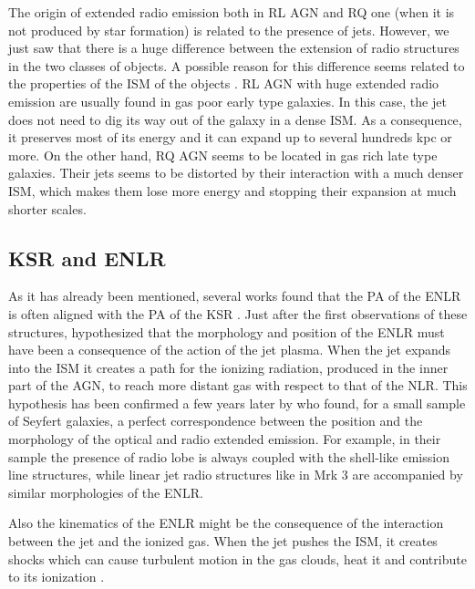 \documentclass[../main.tex]{subfiles}
\begin{document}
The origin of extended radio emission both in RL AGN and RQ one (when it is not produced by star formation) is related to the presence of jets.
However, we just saw that there is a huge difference between the extension of radio structures in the two classes of objects.
A possible reason for this difference seems related to the properties of the ISM of the objects \citep{Whittle04,Gallimore06,Schawinski11,Singh15b}.
RL AGN with huge extended radio emission are usually found in gas poor early type galaxies.
In this case, the jet does not need to dig its way out of the galaxy in a dense ISM.
As a consequence, it preserves most of its energy and it can expand up to several hundreds kpc or more.
On the other hand, RQ AGN seems to be located in gas rich late type galaxies.
Their jets seems to be distorted by their interaction with a much denser ISM, which makes them lose more energy and stopping their expansion at much shorter scales.

\subsection{KSR and ENLR}

As it has already been mentioned, several works found that the PA of the ENLR is often aligned with the PA of the KSR \citep[e.g.][]{Unger87,Wilson94,Capetti96,Falcke98,Schmitt03,Schmitt03b,Morganti07,Husemann13}. 
Just after the first observations of these structures, \citet{Wilson94} hypothesized that the morphology and position of the ENLR must have been a consequence of the action of the jet plasma.
When the jet expands into the ISM it creates a path for the ionizing radiation, produced in the inner part of the AGN, to reach more distant gas with respect to that of the NLR.
This hypothesis has been confirmed a few years later by \citet{Capetti96} who found, for a small sample of Seyfert galaxies, a perfect correspondence between the position and the morphology of the optical and radio extended emission.
For example, in their sample the presence of radio lobe is always coupled with the shell-like emission line structures, while linear jet radio structures like in Mrk 3 are accompanied by similar morphologies of the ENLR.

Also the kinematics of the ENLR might be the consequence of the interaction between the jet and the ionized gas.
When the jet pushes the ISM, it creates shocks which can
cause turbulent motion in the gas clouds, heat it and contribute to its ionization \citep[e.g.][]{Morse98,Rodriguez05,Contini12,Congiu17}.



























\biblio
\end{document}
